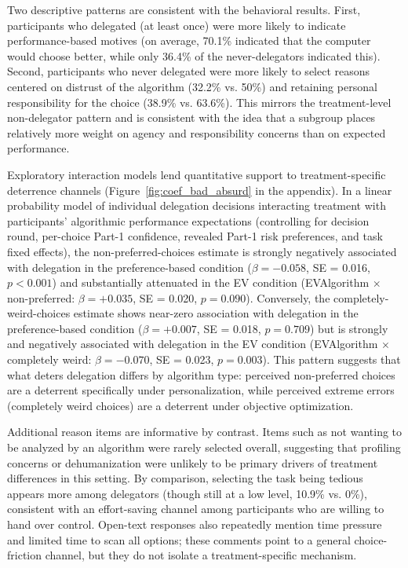 \documentclass[a4paper, 12pt, fleqn]{article}
\theoremstyle{definition}
\begin{document}
Two descriptive patterns are consistent with the behavioral results. First, participants who delegated (at least once) were more likely to indicate performance-based motives (on average, 70.1\% indicated that the computer would choose better, while only 36.4\% of the never-delegators indicated this). Second, participants who never delegated were more likely to select reasons centered on distrust of the algorithm (32.2\% vs. 50\%) and retaining personal responsibility for the choice (38.9\% vs. 63.6\%). This mirrors the treatment-level non-delegator pattern and is consistent with the idea that a subgroup places relatively more weight on agency and responsibility concerns than on expected performance.

Exploratory interaction models lend quantitative support to treatment-specific deterrence channels (Figure~\ref{fig:coef_bad_absurd} in the appendix). In a linear probability model of individual delegation decisions interacting treatment with participants' algorithmic performance expectations (controlling for decision round, per-choice Part-1 confidence, revealed Part-1 risk preferences, and task fixed effects), the non-preferred-choices estimate is strongly negatively associated with delegation in the preference-based condition ($\beta = -0.058$, SE = 0.016, $p < 0.001$) and substantially attenuated in the EV condition (EVAlgorithm $\times$ non-preferred: $\beta = +0.035$, SE = 0.020, $p = 0.090$). Conversely, the completely-weird-choices estimate shows near-zero association with delegation in the preference-based condition ($\beta = +0.007$, SE = 0.018, $p = 0.709$) but is strongly and negatively associated with delegation in the EV condition (EVAlgorithm $\times$ completely weird: $\beta = -0.070$, SE = 0.023, $p = 0.003$). This pattern suggests that what deters delegation differs by algorithm type: perceived non-preferred choices are a deterrent specifically under personalization, while perceived extreme errors (completely weird choices) are a deterrent under objective optimization.

Additional reason items are informative by contrast. Items such as not wanting to be analyzed by an algorithm were rarely selected overall, suggesting that profiling concerns or dehumanization were unlikely to be primary drivers of treatment differences in this setting. By comparison, selecting the task being tedious appears more among delegators (though still at a low level, 10.9\% vs. 0\%), consistent with an effort-saving channel among participants who are willing to hand over control. Open-text responses also repeatedly mention time pressure and limited time to scan all options; these comments point to a general choice-friction channel, but they do not isolate a treatment-specific mechanism.
\end{document}

